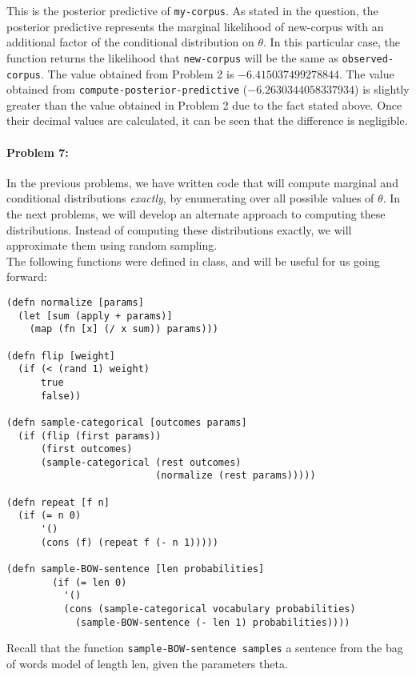 \documentclass[12pt, letterpaper]{article}
\begin{document}
This is the posterior predictive of \texttt{my-corpus}. As stated in the question, the posterior predictive represents the marginal likelihood of new-corpus with an additional factor of the conditional distribution on $\theta$. In this particular case, the function returns the likelihood that \texttt{new-corpus} will be the same as \texttt{observed-corpus}. The value obtained from Problem 2 is $-6.415037499278844$. The value obtained from \texttt{compute-posterior-predictive} ($-6.2630344058337934$) is slightly greater than the value obtained in 
Problem 2 due to the fact stated above. Once their decimal values are calculated, it can be seen that the difference is negligible.

\hrulefill
\paragraph{Problem 7:}

In the previous problems, we have written code that will compute
marginal and conditional distributions \emph{exactly}, by enumerating
over all possible values of $\theta$. In the next problems, we will
develop an alternate approach to computing these
distributions. Instead of computing these distributions exactly, we
will approximate them using random sampling.
\\

\noindent The following functions were defined in class, and will be
useful for us going forward:

\begin{lstlisting}
(defn normalize [params]
  (let [sum (apply + params)]
    (map (fn [x] (/ x sum)) params)))

(defn flip [weight]
  (if (< (rand 1) weight)
      true
      false))

(defn sample-categorical [outcomes params]
  (if (flip (first params))
      (first outcomes)
      (sample-categorical (rest outcomes) 
                          (normalize (rest params)))))

(defn repeat [f n]
  (if (= n 0)
      '()
      (cons (f) (repeat f (- n 1)))))

(defn sample-BOW-sentence [len probabilities]
        (if (= len 0)
          '()
          (cons (sample-categorical vocabulary probabilities)
            (sample-BOW-sentence (- len 1) probabilities))))
\end{lstlisting}

\noindent Recall that the function \texttt{sample-BOW-sentence
  samples} a sentence from the bag of words model of length len, given
the parameters theta.
\\
\end{document}
